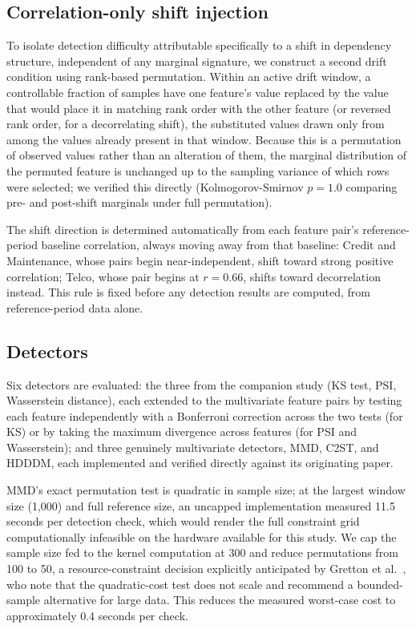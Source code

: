 \documentclass[conference]{IEEEtran}
\begin{document}
\subsection{Correlation-only shift injection}
\label{sec:corrshift}

To isolate detection difficulty attributable specifically to a shift in dependency structure, independent of any marginal signature, we construct a second drift condition using rank-based permutation. Within an active drift window, a controllable fraction of samples have one feature's value replaced by the value that would place it in matching rank order with the other feature (or reversed rank order, for a decorrelating shift), the substituted values drawn only from among the values already present in that window. Because this is a permutation of observed values rather than an alteration of them, the marginal distribution of the permuted feature is unchanged up to the sampling variance of which rows were selected; we verified this directly (Kolmogorov-Smirnov $p = 1.0$ comparing pre- and post-shift marginals under full permutation).

The shift direction is determined automatically from each feature pair's reference-period baseline correlation, always moving away from that baseline: Credit and Maintenance, whose pairs begin near-independent, shift toward strong positive correlation; Telco, whose pair begins at $r = 0.66$, shifts toward decorrelation instead. This rule is fixed before any detection results are computed, from reference-period data alone.

\subsection{Detectors}

Six detectors are evaluated: the three from the companion study (KS test, PSI, Wasserstein distance), each extended to the multivariate feature pairs by testing each feature independently with a Bonferroni correction across the two tests (for KS) or by taking the maximum divergence across features (for PSI and Wasserstein); and three genuinely multivariate detectors, MMD, C2ST, and HDDDM, each implemented and verified directly against its originating paper.

MMD's exact permutation test is quadratic in sample size; at the largest window size (1,000) and full reference size, an uncapped implementation measured 11.5 seconds per detection check, which would render the full constraint grid computationally infeasible on the hardware available for this study. We cap the sample size fed to the kernel computation at 300 and reduce permutations from 100 to 50, a resource-constraint decision explicitly anticipated by Gretton et al.~\cite{gretton2012}, who note that the quadratic-cost test does not scale and recommend a bounded-sample alternative for large data. This reduces the measured worst-case cost to approximately 0.4 seconds per check.
\end{document}
